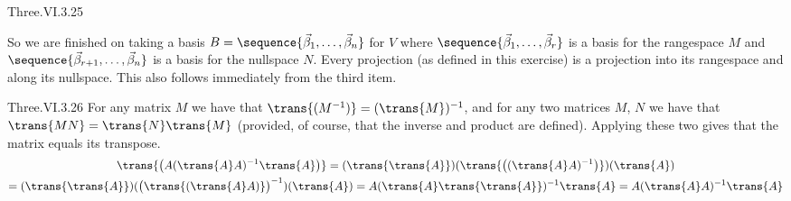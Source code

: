 \begin{ans}{Three.VI.3.25}
\begin{exparts}
          So we are finished on taking a basis
          $B=\sequence{\vec{\beta}_1,\ldots,\vec{\beta}_n}$ for $V$ where
          $\sequence{\vec{\beta}_1,\ldots,\vec{\beta}_r}$ is a basis for
          the rangespace $M$ and
          $\sequence{\vec{\beta}_{r+1},\ldots,\vec{\beta}_n}$ is a
          basis for the nullspace $N$.
        \partsitem Every projection (as defined in this exercise) is
          a projection into its rangespace and along its nullspace.
        \partsitem This also follows immediately from the third item.
      \end{exparts}
    
\end{ans}
\begin{ans}{Three.VI.3.26}
      For any matrix $M$ we have that $\trans{(M^{-1})}=(\trans{M})^{-1}$,
      and for any two matrices $M$, $N$ we have that
      $\trans{MN}=\trans{N}\trans{M}$ (provided, of course,
      that the inverse and product are defined).
      Applying these two gives that the matrix equals its transpose.
      \begin{multline*}
         \trans{\bigl(A(\trans{A}A)^{-1}\trans{A}\bigr)}
         =(\trans{\trans{A}})
           (\trans{\bigl((\trans{A}A)^{-1}\bigr)})
           (\trans{A})                               \\
         =(\trans{\trans{A}})
           ( \bigl(\trans{(\trans{A}A)}\bigr)^{-1} )
           (\trans{A})
         =A
           (\trans{A}\trans{\trans{A}})^{-1}
           \trans{A}
         =A
           (\trans{A}A)^{-1}
           \trans{A}
      \end{multline*}
    
\end{ans}
